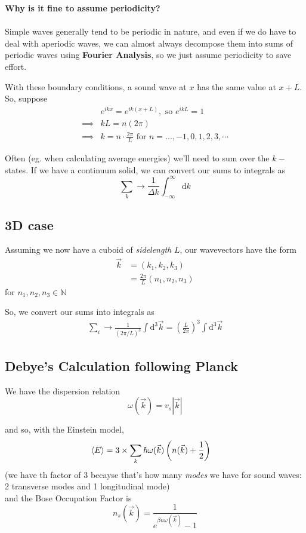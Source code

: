 \documentclass[11pt]{article}
\begin{document}
\begin{bluebox}
  \textbf{Why is it fine to assume periodicity?}
  \\
  \\
  Simple waves generally tend to be periodic in nature, and even if we do have to deal with aperiodic waves, we can almost always decompose them into sums of periodic waves using \textbf{Fourier Analysis}, so we just assume periodicity to save effort.
\end{bluebox}

With these boundary conditions, a sound wave at $x$ has the same value at $x + L$. So, suppose 
\begin{align*}
  &e^{ikx} = e^{ik(x+L)}, \text{ so } e^{ikL} = 1  \\
  \implies& kL = n(2\pi) \\
  \implies& k = n \cdot \frac{2\pi}{L} \text{ for } n=...,-1, 0,1,2,3,\cdots
\end{align*}

Often (eg. when calculating average energies) we'll need to sum over the $k-$states. If we have a continuum solid, we can convert our sums to integrals as
\[ \sum_{k} \rightarrow  \frac{1}{\Delta k} \int_{-\infty}^{\infty} \mathrm{d}k \]

\subsection{3D case}
Assuming we now have a cuboid of \emph{sidelength} $L$, our wavevectors have the form
\begin{align*}
  \vec{k} &= \left(k_1, k_2, k_3 \right) \\
  &= \frac{2\pi}{L} \left(n_1, n_2, n_3\right)
\end{align*}
for $n_1, n_2, n_3 \in \mathbb{N}$

So, we convert our sums into integrals as 
\begin{align*}
  \sum_{i} \rightarrow \frac{1}{(2\pi/L)^3} \int \mathrm{d}^3\vec{k} = \left(\frac{L}{2\pi}\right)^3 \int \mathrm{d}^3\vec{k} 
\end{align*}

\subsection{Debye's Calculation following Planck}
We have the dispersion relation
\[ \omega(\vec{k}) = v_{s} \left| \vec{k} \right| \]

and so, with the Einstein model,
\begin{align*}
  \langle E \rangle &= 3 \times \sum_{k} \hbar \omega(\vec{k}) \left( n(\vec{k}) + \frac{1}{2} \right)
\end{align*}
(we have th factor of $3$ becayse that's how many \textit{modes} we have for sound waves: 2 transverse modes and 1 longitudinal mode)
\\
and the Bose Occupation Factor is
\[ n_s(\vec{k}) = \frac{1}{e^{\beta n \omega(\vec{k})} - 1} \]
\end{document}
